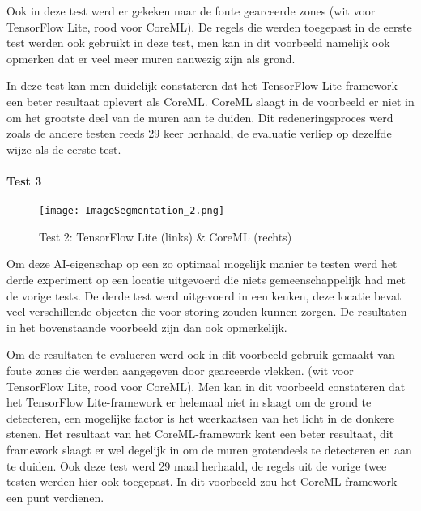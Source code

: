 Ook in deze test werd er gekeken naar de foute gearceerde zones (wit voor TensorFlow Lite, rood voor CoreML). De regels die werden toegepast in de eerste test werden ook gebruikt in deze test, men kan in dit voorbeeld namelijk ook opmerken dat er veel meer muren aanwezig zijn als grond.

In deze test kan men duidelijk constateren dat het TensorFlow Lite-framework een beter resultaat oplevert als CoreML. CoreML slaagt in de voorbeeld er niet in om het grootste deel van de muren aan te duiden. Dit redeneringsproces werd zoals de andere testen reeds 29 keer herhaald, de evaluatie verliep op dezelfde wijze als de eerste test.

\subsubsection{Test 3}
\begin{figure}[H]
	\centering
	\texttt{[image: ImageSegmentation\_2.png]}
	\caption{Test 2: TensorFlow Lite (links) \& CoreML (rechts)}
\end{figure}

Om deze AI-eigenschap op een zo optimaal mogelijk manier te testen werd het derde experiment op een locatie uitgevoerd die niets gemeenschappelijk had met de vorige tests. De derde test werd uitgevoerd in een keuken, deze locatie bevat veel verschillende objecten die voor storing zouden kunnen zorgen. De resultaten in het bovenstaande voorbeeld zijn dan ook opmerkelijk.

Om de resultaten te evalueren werd ook in dit voorbeeld gebruik gemaakt van foute zones die werden aangegeven door gearceerde vlekken. (wit voor TensorFlow Lite, rood voor CoreML). Men kan in dit voorbeeld constateren dat het TensorFlow Lite-framework er helemaal niet in slaagt om de grond te detecteren, een mogelijke factor is het weerkaatsen van het licht in de donkere stenen. Het resultaat van het CoreML-framework kent een beter resultaat, dit framework slaagt er wel degelijk in om de muren grotendeels te detecteren en aan te duiden. Ook deze test werd 29 maal herhaald, de regels uit de vorige twee testen werden hier ook toegepast. In dit voorbeeld zou het CoreML-framework een punt verdienen.

\chapter{}
\label{ch:resultaten}

